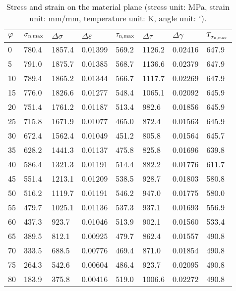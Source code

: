 \begin{table}[htbp]
  \centering
  \caption{Stress and strain on the material plane (stress unit: MPa, strain unit: mm/mm, temperature unit: K, angle unit: $^\circ$). }
    \begin{tabular}{p{1.5cm}p{1.5cm}p{1.5cm}p{1.5cm}p{1.5cm}p{1.5cm}p{1.5cm}p{1.5cm}}
    \toprule
    $\varphi$ & $\sigma_{\rm{n,max}}$ & $\Delta \sigma$ & $\Delta \varepsilon$ & $\tau_{\rm{n,max}}$ & $\Delta \tau$ & $\Delta \gamma$ & $T_{\sigma_{\rm{n,max}}}$ \\
    \midrule
    0     & 780.4  & 1857.4  & 0.01399  & 569.2  & 1126.2  & 0.02416  & 647.9  \\
    5     & 791.0  & 1875.7  & 0.01385  & 568.7  & 1136.6  & 0.02379  & 647.9  \\
    10    & 789.4  & 1865.2  & 0.01344  & 566.7  & 1117.7  & 0.02269  & 647.9  \\
    15    & 776.0  & 1826.6  & 0.01277  & 548.4  & 1065.1  & 0.02092  & 645.9  \\
    20    & 751.4  & 1761.2  & 0.01187  & 513.4  & 982.6  & 0.01856  & 645.9  \\
    25    & 715.8  & 1671.9  & 0.01077  & 465.0  & 872.4  & 0.01563  & 645.9  \\
    30    & 672.4  & 1562.4  & 0.01049  & 451.2  & 805.8  & 0.01564  & 645.7  \\
    35    & 628.2  & 1441.3  & 0.01137  & 475.8  & 825.8  & 0.01696  & 639.8  \\
    40    & 586.4  & 1321.3  & 0.01191  & 514.4  & 882.2  & 0.01776  & 611.7  \\
    45    & 551.4  & 1213.1  & 0.01209  & 538.5  & 928.7  & 0.01803  & 580.8  \\
    50    & 516.2  & 1119.7  & 0.01191  & 546.2  & 947.0  & 0.01775  & 580.0  \\
    55    & 479.7  & 1025.1  & 0.01136  & 537.3  & 937.1  & 0.01693  & 556.9  \\
    60    & 437.3  & 923.7  & 0.01046  & 513.9  & 902.1  & 0.01560  & 533.4  \\
    65    & 389.5  & 812.1  & 0.00925  & 479.7  & 862.4  & 0.01557  & 490.8  \\
    70    & 333.5  & 688.5  & 0.00776  & 469.4  & 871.0  & 0.01854  & 490.8  \\
    75    & 264.3  & 542.6  & 0.00604  & 486.4  & 923.7  & 0.02095  & 490.8  \\
    80    & 183.9  & 375.8  & 0.00416  & 519.0  & 1006.6  & 0.02272  & 490.8  \\

\end{tabular}
\end{table}
